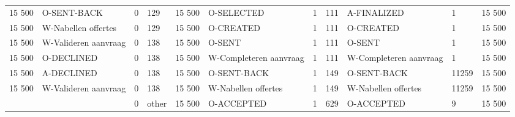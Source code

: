 \begin{tabular}{llllllllllr}
15 500 & O-SENT-BACK & 0 & 129 & 15 500 & O-SELECTED & 1 & 111 & A-FINALIZED & 1 & 15 500 \\
15 500 & W-Nabellen offertes & 0 & 129 & 15 500 & O-CREATED & 1 & 111 & O-CREATED & 1 & 15 500 \\
15 500 & W-Valideren aanvraag & 0 & 138 & 15 500 & O-SENT & 1 & 111 & O-SENT & 1 & 15 500 \\
15 500 & O-DECLINED & 0 & 138 & 15 500 & W-Completeren aanvraag & 1 & 111 & W-Completeren aanvraag & 1 & 15 500 \\
15 500 & A-DECLINED & 0 & 138 & 15 500 & O-SENT-BACK & 1 & 149 & O-SENT-BACK & 11259 & 15 500 \\
15 500 & W-Valideren aanvraag & 0 & 138 & 15 500 & W-Nabellen offertes & 1 & 149 & W-Nabellen offertes & 11259 & 15 500 \\
 &  & 0 & other & 15 500 & O-ACCEPTED & 1 & 629 & O-ACCEPTED & 9 & 15 500 \\
\bottomrule
\end{tabular}
